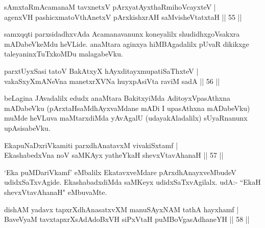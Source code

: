 
\begin{shl}
sAmxtaRmAcamanaM tavxnetxV pArxyatAyxthaRmihoVcayxteV | \\
agenxVH pashicxmatoV\s thAnetxV pArxkishxrAH saMvisheVtatxtaH \hfill|| 55 || 
\end{shl}

\begin{artha}
samxqqti parxsidadhxvAda Acamanavanunx koneyalilx shudidhxgoVsakxra 
mADabeVkeMdu heVLide. anaMtara aginxya hiMBAgadalilx pUvaR dikikxge 
taleyaninxTuTxkoMDu malagabeVku.
\end{artha}


\begin{shl}
parxtUyxSasi tatoV BakAtxyX hAyxditayxmupatiSaThxteV | \\
vakaSxyXmANeVna manetxrXVNa huyxpAsiVta raviM sadA \hfill|| 56 || 
\end{shl}

\begin{artha}
beLagina JAvadalilx edudx anaMtara BakitxyiMda AditoyxVpasAthxna 
mADabeVku (pArxtaHsaMdhAyxvaMdane mADi I upasAthxna mADabeVku) muMde 
heVLuva maMtarxdiMda yAvAgalU (udayakAladalilx) sUyaRnanunx 
upAsisabeVku.
\end{artha}


\begin{shl}
EkapuNaDxriVkamiti parxdhAnatavxM vivakiSxtamf | \\
EkashabedxVna noV saMKAyx yatheYkaH shevxVtavAhanaH \hfill|| 57 || 
\end{shl}

\begin{artha}
`Eka puMDariVkamf' eMbalilx EkatavxveMdare pArxdhAnayxveMbudeV 
udidxSaTxvAgide. EkashabadxdiMda saMKeyx udidxSaTxvAgilalx. udA:- 
``EkaH shevxVtavAhanaH" eMbuvaMte.
\end{artha}


\begin{shl}
dishAM yadavx tapxrXdhAnasatxvXM manuSAyxNAM tathA hayxhamf | \\
BaveVyaM tavxtapxrXsAdAdoBxVH siPxVtaH puMBoVgasAdhaneYH \hfill|| 58 || 
\end{shl}

